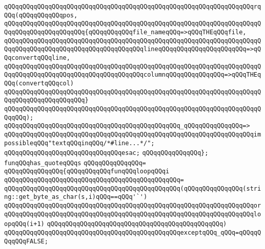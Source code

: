 \verb|qQQqqQQqqQQqqQQqqQQqqQQqqQQqqQQqqQQqqQQqqQQqqQQqqQQqqQQqqQQqqQQqqQQqrqQQq(qQQqqQQqqQQqpos,|\newline
\verb|qQQqqQQqqQQqqQQqqQQqqQQqqQQqqQQqqQQqqQQqqQQqqQQqqQQqqQQqqQQqqQQqqQQqqQQqqQQqqQQqqQQqqQQqqQQq{qQQqqQQqqQQqfile_nameqQQq=>qQQqTHEqQQqfile,|\newline
\verb|qQQqqQQqqQQqqQQqqQQqqQQqqQQqqQQqqQQqqQQqqQQqqQQqqQQqqQQqqQQqqQQqqQQqqQQqqQQqqQQqqQQqqQQqqQQqqQQqqQQqqQQqqQQqlineqQQqqQQqqQQqqQQqqQQqqQQq=>qQQqconvertqQQqline,|\newline
\verb|qQQqqQQqqQQqqQQqqQQqqQQqqQQqqQQqqQQqqQQqqQQqqQQqqQQqqQQqqQQqqQQqqQQqqQQqqQQqqQQqqQQqqQQqqQQqqQQqqQQqqQQqqQQqcolumnqQQqqQQqqQQqqQQq=>qQQqTHEqQQq(convertqQQqcol)|\newline
\verb|qQQqqQQqqQQqqQQqqQQqqQQqqQQqqQQqqQQqqQQqqQQqqQQqqQQqqQQqqQQqqQQqqQQqqQQqqQQqqQQqqQQqqQQqqQQq}|\newline
\verb|qQQqqQQqqQQqqQQqqQQqqQQqqQQqqQQqqQQqqQQqqQQqqQQqqQQqqQQqqQQqqQQqqQQqqQQqqQQq);|\newline
\newline
\verb|qQQqqQQqqQQqqQQqqQQqqQQqqQQqqQQqqQQqqQQqqQQqqQQq_qQQqqQQqqQQqqQQq=>|\newline
\verb|qQQqqQQqqQQqqQQqqQQqqQQqqQQqqQQqqQQqqQQqqQQqqQQqqQQqqQQqqQQqqQQqqQQqimpossibleqQQq"textqQQqinqQQq/*#line...*/";|\newline
\newline
\verb|qQQqqQQqqQQqqQQqqQQqqQQqqQQqqQQqesac;|\newline
\verb|qQQqqQQqqQQqqQQq};|\newline
\newline
\verb|funqQQqhas_quoteqQQqs|\newline
\verb|qQQqqQQqqQQqqQQq=|\newline
\verb|qQQqqQQqqQQqqQQq{qQQqqQQqqQQqfunqQQqloopqQQqi|\newline
\verb|qQQqqQQqqQQqqQQqqQQqqQQqqQQqqQQqqQQqqQQqqQQqqQQq=|\newline
\verb|qQQqqQQqqQQqqQQqqQQqqQQqqQQqqQQqqQQqqQQqqQQqqQQq(qQQqqQQqqQQqqQQq(string::get_byte_as_char(s,i)qQQq==qQQq'`')|\newline
\verb|qQQqqQQqqQQqqQQqqQQqqQQqqQQqqQQqqQQqqQQqqQQqqQQqqQQqqQQqqQQqqQQqqQQqor|\newline
\verb|qQQqqQQqqQQqqQQqqQQqqQQqqQQqqQQqqQQqqQQqqQQqqQQqqQQqqQQqqQQqqQQqqQQqloopqQQq(i+1)|\newline
\verb|qQQqqQQqqQQqqQQqqQQqqQQqqQQqqQQqqQQqqQQqqQQqqQQq)|\newline
\verb|qQQqqQQqqQQqqQQqqQQqqQQqqQQqqQQqqQQqqQQqqQQqqQQqexceptqQQq_qQQq=qQQqqQQqqQQqFALSE;|\newline
